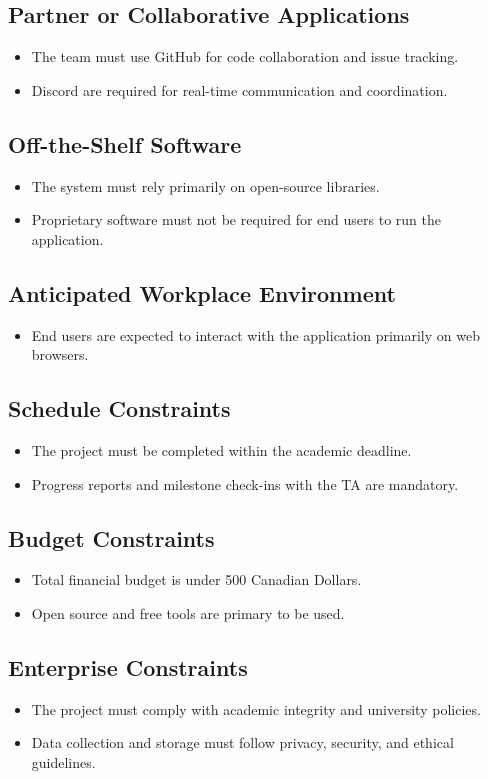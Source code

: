 \documentclass[12pt]{article}
\begin{document}
\subsection{Partner or Collaborative Applications}
	\begin{itemize}
		\item The team must use GitHub for code collaboration and issue tracking.
		\item  Discord are required for real-time communication and coordination.
	\end{itemize}
\subsection{Off-the-Shelf Software}
	\begin{itemize}
		\item The system must rely primarily on open-source libraries.
		\item Proprietary software must not be required for end users to run the application.
	\end{itemize}
\subsection{Anticipated Workplace Environment}
	\begin{itemize}
		\item End users are expected to interact with the application primarily on web browsers.
	\end{itemize}
\subsection{Schedule Constraints}
	\begin{itemize}
		\item The project must be completed within the academic deadline.
		\item Progress reports and milestone check-ins with the TA are mandatory.
	\end{itemize}
\subsection{Budget Constraints}
	\begin{itemize}
		\item Total financial budget is under 500 Canadian Dollars.
		\item Open source and free tools are primary to be used.
	\end{itemize}
\subsection{Enterprise Constraints}
	\begin{itemize}
		\item The project must comply with academic integrity and university policies.
		\item Data collection and storage must follow privacy, security, and ethical guidelines.
	\end{itemize}
\end{document}
